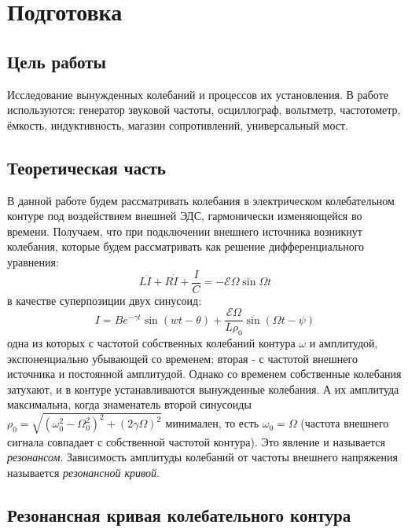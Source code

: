 \documentclass{lab}
\begin{document}


\section*{Подготовка}

\subsection*{Цель работы}

Исследование вынужденных колебаний и процессов их установления.
В работе используются: генератор звуковой частоты, осциллограф, вольтметр, частотометр,
ёмкость, индуктивность, магазин сопротивлений, универсальный мост.

\subsection*{Теоретическая часть}

В данной работе будем рассматривать колебания в электрическом колебательном контуре под
воздействием внешней ЭДС, гармонически изменяющейся во времени. 
Получаем, что при подключении внешнего источника возникнут колебания, которые будем
рассматривать как решение дифференциального уравнения:
\begin{equation}
L\ddot{I} + R \dot{I} + \dfrac{I}{C} = - \mathscr{E} \Omega \sin \Omega t
\end{equation}
в качестве суперпозиции двух синусоид:
\begin{equation}
I = Be^{-\gamma t} \sin (wt-\theta) + \dfrac{\mathscr{E} \Omega}{L \rho_0} \sin (\Omega t - \psi)
\end{equation}
одна из которых с частотой собственных колебаний контура $\omega$ и амплитудой,
экспоненциально убывающей со временем; вторая - с частотой внешнего источника и постоянной
амплитудой. Однако со временем собственные колебания затухают, и в контуре устанавливаются
вынужденные колебания. А их амплитуда максимальна, когда знаменатель второй синусоиды
$\rho_0 = \sqrt{(\omega_0^2 - \Omega^2_0)^2 + (2\gamma \Omega)^2}$ минимален, то есть
$\omega_0 = \Omega$ (частота внешнего сигнала совпадает с собственной частотой контура).
Это явление и называется \textit{резонансом}. Зависимость амплитуды колебаний от частоты
внешнего напряжения называется \textit{резонансной кривой}.

\subsection*{Резонансная кривая колебательного контура}
\end{document}
